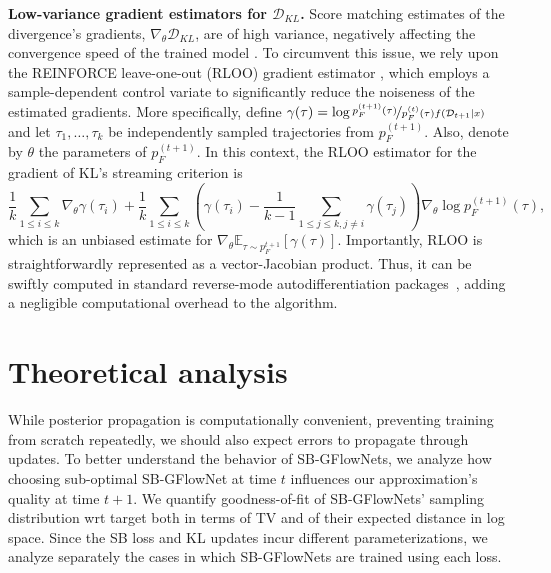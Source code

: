 \documentclass{article}
\newcommand{\pp}[1]{\vspace{0pt}\noindent\textbf{#1}}
\theoremstyle{plain}
\theoremstyle{definition}
\theoremstyle{remark}
\theoremstyle{remark}
\begin{document}
\pp{Low-variance gradient estimators for $\mathcal{D}_{KL}$.} Score matching estimates of the divergence's gradients, $\nabla_{\theta} \mathcal{D}_{KL}$, are of high variance, negatively affecting the convergence speed of the trained model \cite{xu20pg, papini18pg, DBLP:journals/jmlr/MohamedRFM20}. To circumvent this issue, we rely upon the REINFORCE leave-one-out (RLOO) gradient estimator \cite{mnih2016variational}, which employs a sample-dependent control variate to significantly reduce the noiseness of the estimated gradients. More specifically, define $\gamma(\tau) = \log \nicefrac{p_{F}^{(t + 1)}(\tau)}{p_{F}^{(t)}(\tau) f(\mathcal{D}_{t+1}|x)}$ and let $\tau_{1}, \dots, \tau_{k}$ be independently sampled trajectories from $p_{F}^{(t + 1)}$. Also, denote by $\theta$ the parameters of $p_{F}^{(t + 1)}$. In this context, the RLOO estimator for the gradient of KL's streaming criterion is 
\begin{equation}
    \frac{1}{k} \sum_{1 \le i \le k} \nabla_{\theta} \gamma(\tau_{i}) + \frac{1}{k} \sum_{1 \le i \le k} \left( \gamma(\tau_{i}) - \frac{1}{k - 1} \sum_{1 \le j \le k, j \neq i} \gamma(\tau_{j}) \right) \nabla_{\theta} \log p_{F}^{(t+1)}(\tau), %
\end{equation}
which is an unbiased estimate for $\nabla_{\theta} \mathbb{E}_{\tau \sim p_{F}^{t + 1}}[\gamma(\tau)]$. Importantly, RLOO is straightforwardly represented as a vector-Jacobian product. Thus, it can be swiftly computed in standard reverse-mode autodifferentiation packages~\citep{Paszke_PyTorch_An_Imperative_2019}, adding a negligible computational overhead to the algorithm.  

\section{Theoretical analysis} \label{subsec:th}  

While posterior propagation is computationally convenient, preventing training from scratch repeatedly, we should also expect errors to propagate through updates. To better understand the behavior of SB-GFlowNets, we analyze how choosing sub-optimal SB-GFlowNet at time $t$ influences our approximation's quality at time $t+1$. We quantify goodness-of-fit of SB-GFlowNets' sampling distribution wrt target both in terms of TV and of their expected distance in log space. Since the SB loss and KL updates incur different parameterizations, we analyze separately the cases in which SB-GFlowNets are trained using each loss. 
\end{document}
